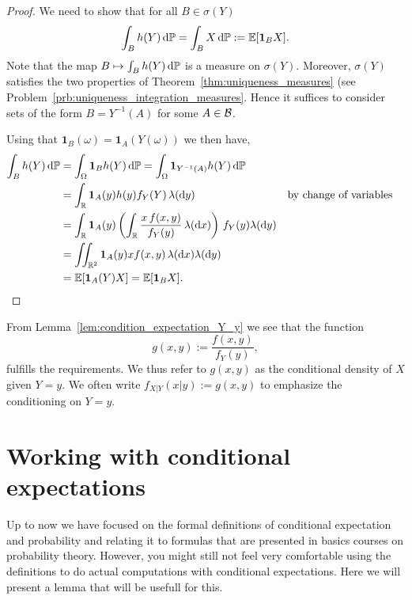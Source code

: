 \begin{proof}
We need to show that for all $B \in \sigma(Y)$
\[
	\int_B h(Y) \, \mathrm{d} \mathbb P = \int_B X \, \mathrm{d} \mathbb P := \mathbb E[\mathbf{1}_B X]. 
\]
Note that the map $B \mapsto \int_B h(Y) \, \mathrm{d} \mathbb P$ is a measure on $\sigma(Y)$. Moreover, $\sigma(Y)$ satisfies the two properties of Theorem~\ref{thm:uniqueness_measures} (see Problem~\ref{prb:uniqueness_integration_measures}. Hence it suffices to consider sets of the form $B = Y^{-1}(A)$ for some $A \in \mathcal B$. 

Using that $\mathbf{1}_B(\omega) = \mathbf{1}_A(Y(\omega))$ we then have,
\begin{align*}
	\int_B h(Y) \, \mathrm{d} \mathbb P &= \int_\Omega \mathbf{1}_{B} h(Y) \, \mathrm{d} \mathbb P 
	= \int_\Omega \mathbf{1}_{Y^{-1}(A)} h(Y) \, \mathrm{d} \mathbb P \\
	&= \int_{\mathbb R} \mathbf{1}_{A}(y) h(y) f_Y(Y) \, \lambda (\mathrm{d} y) &&\text{by change of variables}\\
	&= \int_{\mathbb R} \mathbf{1}_A(y) \left(\int_{\mathbb R} \frac{x \, f(x,y)}{f_Y(y)} \, \lambda(\mathrm{d} x)\right)
		\, f_Y(y) \lambda(\mathrm{d} y)\\
	&= \iint_{\mathbb R^2} \mathbf{1}_A(y) x f(x,y) \, \lambda(\mathrm{d} x) \lambda(\mathrm{d} y)\\
	&= \mathbb E[\mathbf{1}_A(Y) X] = \mathbb E[\mathbf{1}_B X].
\end{align*}
\end{proof}


From Lemma~\ref{lem:condition_expectation_Y_y} we see that the function
\begin{equation}\label{eq:def_condition_pdf}
	g(x,y) := \frac{f(x,y)}{f_Y(y)},
\end{equation}
fulfills the requirements. We thus refer to $g(x,y)$ as the conditional density of $X$ given $Y = y$. We often write $f_{X|Y}(x|y) := g(x,y)$ to emphasize the conditioning on $Y = y$. 



\section{Working with conditional expectations}

Up to now we have focused on the formal definitions of conditional expectation and probability and relating it to formulas that are presented in basics courses on probability theory. However, you might still not feel very comfortable using the definitions to do actual computations with conditional expectations. Here we will present a lemma that will be usefull for this.

